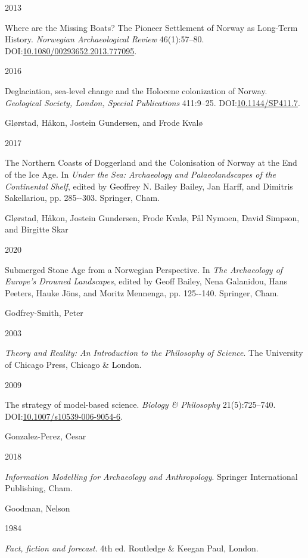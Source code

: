 \documentclass[
  a4paper,
  oneside]{uiophdthesis}
\newlength{\cslhangindent}
\newlength{\csllabelwidth}
\newlength{\cslentryspacingunit} %
\newenvironment{CSLReferences}[2] %
 {%
  \setlength{\parindent}{0pt}
  \ifodd #1
  \let\oldpar\par
  \def\par{\hangindent=\cslhangindent\oldpar}
  \fi
  \setlength{\parskip}{#2\cslentryspacingunit}
 }%
 {}
\newcommand{\CSLBlock}[1]{#1\hfill\break}
\newcommand{\CSLLeftMargin}[1]{\parbox[t]{\csllabelwidth}{#1}}
\newcommand{\CSLRightInline}[1]{\parbox[t]{\linewidth - \csllabelwidth}{#1}\break}
\begin{document}
\begin{CSLReferences}{0}{0}
\leavevmode{}%
\CSLLeftMargin{ 2013 }
\CSLRightInline{{Where are the Missing Boats? The Pioneer Settlement of Norway as Long-Term History}. \emph{Norwegian Archaeological Review} 46(1):57--80. DOI:\href{https://doi.org/10.1080/00293652.2013.777095}{10.1080/00293652.2013.777095}.}

\leavevmode{}%
\CSLLeftMargin{ 2016 }
\CSLRightInline{Deglaciation, sea-level change and the Holocene colonization of Norway. \emph{Geological Society, London, Special Publications} 411:9--25. DOI:\href{https://doi.org/10.1144/SP411.7}{10.1144/SP411.7}.}

\leavevmode{}%
\CSLBlock{Glørstad, Håkon, Jostein Gundersen, and Frode Kvalø}
\CSLLeftMargin{ 2017}
\CSLRightInline{{The Northern Coasts of Doggerland and the Colonisation of Norway at the End of the Ice Age}. In \emph{{Under the Sea: Archaeology and Palaeolandscapes of the Continental Shelf}}, edited by Geoffrey N. Bailey Bailey, Jan Harff, and Dimitris Sakellariou, pp. 285-\/-303. Springer, Cham.}

\leavevmode{}%
\CSLBlock{Glørstad, Håkon, Jostein Gundersen, Frode Kvalø, Pål Nymoen, David Simpson, and Birgitte Skar}
\CSLLeftMargin{ 2020}
\CSLRightInline{{Submerged Stone Age from a Norwegian Perspective}. In \emph{{The Archaeology of Europe's Drowned Landscapes}}, edited by Geoff Bailey, Nena Galanidou, Hans Peeters, Hauke Jöns, and Moritz Mennenga, pp. 125-\/-140. Springer, Cham.}

\leavevmode{}%
\CSLBlock{Godfrey-Smith, Peter}
\CSLLeftMargin{ 2003}
\CSLRightInline{\emph{{Theory and Reality: An Introduction to the Philosophy of Science}}. The University of Chicago Press, Chicago \& London.}

\leavevmode{}%
\CSLLeftMargin{ 2009 }
\CSLRightInline{The strategy of model-based science. \emph{Biology \& Philosophy} 21(5):725--740. DOI:\href{https://doi.org/10.1007/s10539-006-9054-6}{10.1007/s10539-006-9054-6}.}

\leavevmode{}%
\CSLBlock{Gonzalez-Perez, Cesar}
\CSLLeftMargin{ 2018}
\CSLRightInline{\emph{{Information Modelling for Archaeology and Anthropology}}. Springer International Publishing, Cham.}

\leavevmode{}%
\CSLBlock{Goodman, Nelson}
\CSLLeftMargin{ 1984}
\CSLRightInline{\emph{{Fact, fiction and forecast}}. 4th ed. Routledge \& Keegan Paul, London.}


\end{CSLReferences}
\end{document}
